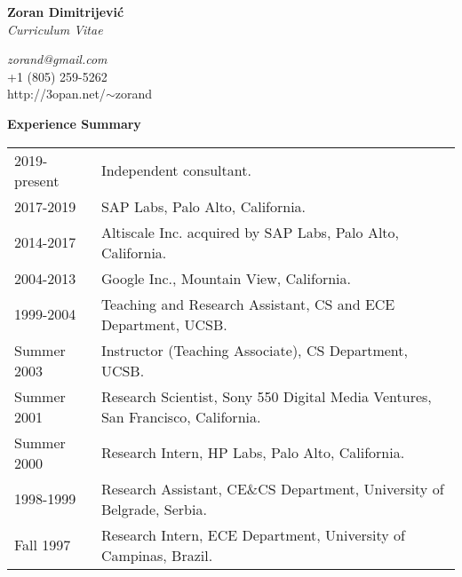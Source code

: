 \documentclass[10pt]{article}
\renewcommand{\section}[1]{ \vspace{10pt}\begin{flushleft}{\hspace{-0.2in }\Large\bf
    #1}\end{flushleft}\nopagebreak }
\begin{document}
\begin{center}
\vspace{-1.5in}
  {\Large\bf Zoran Dimitrijevi\'{c}}\\
  {\large\em Curriculum Vitae}
\end{center}

\begin{center}
{\em zorand@gmail.com}\\
+1 (805) 259-5262\\
http://3opan.net/$\sim$zorand
\end{center}

%

\vspace{-5pt}
\section{Experience Summary}

\begin{tabular}{ll}
2019-present    & Independent consultant.\\
2017-2019       & SAP Labs, Palo Alto, California.\\
2014-2017       & Altiscale Inc. acquired by SAP Labs, Palo Alto, California.\\
2004-2013       & Google Inc., Mountain View, California.\\
1999-2004	& Teaching and Research Assistant, 
			CS and ECE Department, UCSB. \\
Summer 2003	& Instructor (Teaching Associate), CS Department, UCSB. \\
Summer 2001	& Research Scientist, Sony 550 Digital Media Ventures, 
			San Francisco, California. \\
Summer 2000	& Research Intern, HP Labs, Palo Alto, California. \\
1998-1999	& Research Assistant, CE\&CS Department, University of Belgrade, Serbia.\\
Fall 1997	& Research Intern, ECE Department, University of Campinas, Brazil. \\
\end{tabular}
\end{document}
